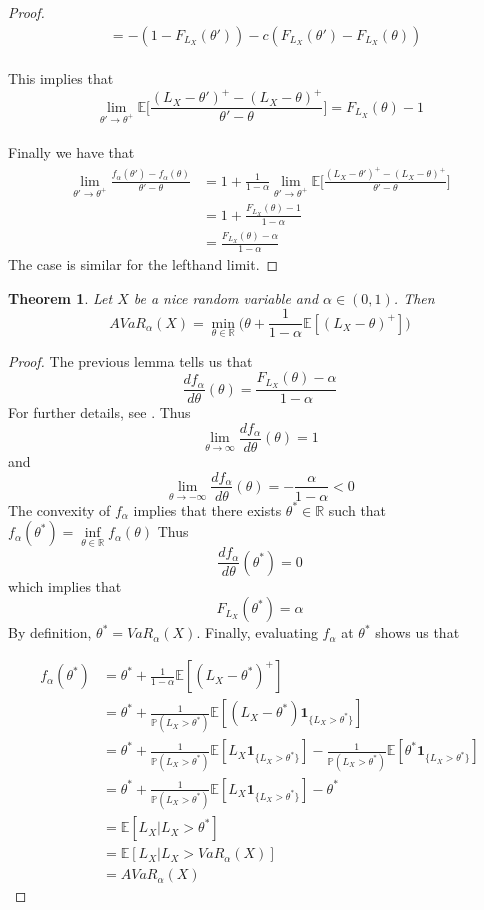 \documentclass[12pt]{amsart}
\newtheorem{thm}{Theorem}[section]
\newcommand{\al}{\alpha}
\newcommand{\E}{\mathbb{E}}
\newcommand{\R}{\mathbb{R}}
\renewcommand{\P}{\mathbb{P}}
\begin{document}
\begin{proof}
\begin{align*}
&= -(1-F_{L_X}(\theta')) -c(F_{L_X}(\theta') - F_{L_X}(\theta))
\end{align*}\\
This implies that $$\lim_{\theta' \rightarrow \theta^+}\E\bigg[ \frac{(L_X - \theta')^+ - (L_X - \theta)^+}{\theta'-\theta} \bigg] = F_{L_X}(\theta) -1$$\\
Finally we have that 
\begin{align*}
\lim_{\theta' \rightarrow \theta^+} \frac{f_\al(\theta') - f_\al(\theta)}{\theta' - \theta} 
&= 1 + \frac{1}{1-\al}\lim_{\theta' \rightarrow \theta^+}\E\bigg[ \frac{(L_X - \theta')^+ - (L_X - \theta)^+}{\theta'-\theta} \bigg] \\
&= 1 + \frac{F_{L_X}(\theta) -1}{1-\al}\\
&= \frac{F_{L_X}(\theta) -\al}{1-\al}
\end{align*}
The case is similar for the lefthand limit.

\end{proof}

\begin{thm}
Let $X$ be a nice random variable and $\al\in (0,1)$. Then $$AVaR_{\al}(X) = \min_{\theta \in \R} \bigg(\theta + \frac{1}{1-\al}\E[(L_X - \theta)^+]\bigg)$$
\end{thm}

\begin{proof} 
The previous lemma tells us that $$\frac{d f_{\al}}{d \theta}(\theta) = \frac{F_{L_X}(\theta) -\al}{1-\al} $$ For further details, see \cite{RockUr}. Thus $$\lim_{\theta \rightarrow \infty}\frac{d f_{\al}}{d \theta}(\theta) = 1$$ and $$\lim_{\theta \rightarrow -\infty} \frac{d f_{\al}}{d \theta}(\theta) = - \frac{\al}{1-\al} <0$$
The convexity of $f_{\al}$ implies that there exists $\theta^* \in \R$ such that $f_{\al}(\theta^*) = \inf\limits_{\theta \in \R}f_{\al}(\theta)$
Thus $$\frac{d f_{\al}}{d \theta}(\theta^*) = 0$$
which implies that $$F_{L_X}(\theta^*) = \al$$
By definition, $\theta^* = VaR_{\al}(X)$. Finally, evaluating $f_{\al}$ at $\theta^*$ shows us that 

\begin{align*}
f_{\al}(\theta^*)  
&=  \theta^* + \frac{1}{1- \al}\E[(L_X - \theta^*)^+]\\
& = \theta^* + \frac{1}{\P(L_X>\theta^*)}\E[(L_X-\theta^*)\mathbf{1}_{\{L_X>\theta^*\}}] \\
& = \theta^* + \frac{1}{\P(L_X>\theta^*)}\E[L_X\mathbf{1}_{\{L_X>\theta^*\}}] - \frac{1}{\P(L_X>\theta^*)}\E[\theta^*\mathbf{1}_{\{L_X>\theta^*\}}] \\
& = \theta^* + \frac{1}{\P(L_X>\theta^*)}\E[L_X\mathbf{1}_{\{L_X>\theta^*\}}] - \theta^* \\
&= \E[L_X|L_X> \theta^*] \\
& = \E[L_X|L_X>VaR_{\al}(X)] \\
& = AVaR_{\al}(X)
\end{align*}

\end{proof}
\end{document}
